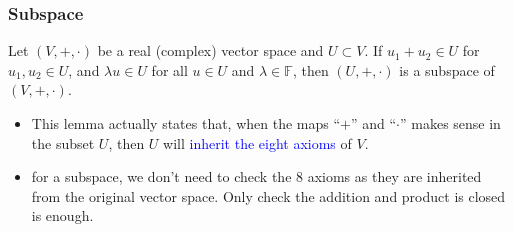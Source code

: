 \documentclass{beamer}
\begin{document}
\begin{frame}
    \frametitle{Subspace}
    \hspace{1em}
    Let $(V,+,\cdot)$ be a real (complex) vector space and $U\subset V$. If $u_1+u_2\in U$ for $u_1,u_2\in U$, and $\lambda u\in U$ for all $u\in U$ and $\lambda \in \mathbb{F}$, then $(U,+,\cdot)$ is a
    subspace of $(V,+,\cdot)$.\\

    \hspace{1em}
    \begin{itemize}
        \item This lemma actually states that, when the maps “$+$” and “$\cdot$” makes sense in the subset $U$, then $U$ will \textcolor{blue}{inherit the eight axioms} of $V$.
        \item for a subspace, we don’t need to check the 8 axioms as they are
              inherited from the original vector space. Only check the addition and product is closed is enough.
    \end{itemize}


\end{frame}
\end{document}
